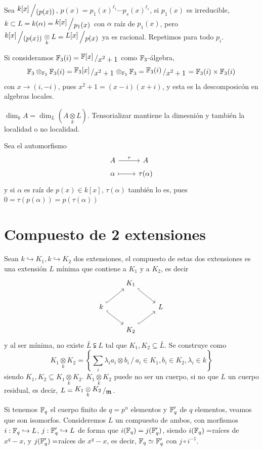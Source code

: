 \begin{ejem}
    Sea $\modulo{k[x]}{(p(x))}$, $p(x) = p_1(x)^{\ell_1} \cdots p_s(x)^{\ell_s}$, si $p_1(x)$ es irreducible, $k \subset L=k(\alpha) = \modulo{k[x]}{p_1(x)}$ con $\alpha$ ra\'iz de $p_1(x)$, pero $\modulo{k[x]}{(p(x))} \underset{k}{\otimes} L = \modulo{L[x]}{p(x)}$ ya es racional. Repetimos para todo $p_i$.
    
    Si consideramos $\bb F_3(i) = \modulo{\bb F[x]}{x^2+1}$ como $\mathbb{F}_3$-\'algebra, 
    $$\bb F_3 \otimes_{\bb F_3} \bb F_3(i) = \modulo{\bb F_3[x]}{x^2+1} \otimes_{\bb F_3} \bb F_3 = \modulo{\bb F_3(i)}{x^2+1} = \bb F_3(i) \times \bb F_3(i)$$
    con $x\to (i,-i)$, pues $x^2+1=(x-i)(x+i)$, y esta es la descomposic\'on en algebras locales.
\end{ejem}
\begin{prop}
    $\dim_k A = \dim_L(A \underset{k}{\otimes} L)$. Tensorializar mantiene la dimesni\'on y tambi\'en la localidad o no localidad. 
\end{prop}
\begin{obs}
    Sea el automorfismo
    $$\bt A \rar{\tau} & A \\[-5mm] \alpha \rarmaps & \tau(\alpha) \et$$
    y si $\alpha$ es ra\'iz de $p(x)\in k[x]$, $\tau(\alpha)$ tambi\'en lo es, pues $0 = \tau(p(\alpha)) = p(\tau(\alpha))$
\end{obs}
\section{Compuesto de 2 extensiones}
Sean $k \hookrightarrow K_1, k\hookrightarrow K_2$ dos extensiones, el compuesto de estas dos extensiones es una extensi\'on $L$ m\'inima que contiene a $K_1$ y a $K_2$, es decir
$$\bt & K_1  \arrow[hook]{rd}\\ k \arrow[hook]{ru} \arrow[hook]{rd} &  & L\\ & \arrow[hook]{ru}  K_2 \et$$
y al ser m\'inima, no existe $\bar L \subsetneqq L $ tal que $K_1,K_2 \subseteq \bar L$. Se construye como
$$K_1 \underset{k}{\otimes} K_2 = \left\{ \sum_i \lambda_i a_i \otimes b_i \, / \, a_i \in K_1, b_i \in K_2, \lambda_i \in k \right\}$$ 
siendo $K_1,K_2 \subseteq K_1\underset{k}{\otimes} K_2$. $K_1\underset{k}{\otimes} K_2$ puede no ser un cuerpo, si no que $L$ un cuerpo residual, es decir, $L = \modulo{K_1\underset{k}{\otimes} K_2}{\m}$.

Si tenemos $\mathbb{F}_q$ el cuerpo finito de $q=p^n$ elementos y $\mathbb{F}'_q$ de $q$ elementos, veamos que son isomorfos. Consideremos $L$ un compuesto de ambos, con morfismos $i: \mathbb{F}_q \hookrightarrow L$, $j: \mathbb{F}'_q \hookrightarrow L$ de forma que $i(\mathbb{F}_q) = j(\mathbb{F}'_q)$, siendo $i(\mathbb{F}_q) =$ra\'ices de $x^q-x$, y $j(\mathbb{F}'_q)=$ra\'ices de $x^q-x$, es decir, $\mathbb{F}_q \simeq \mathbb{F}'_q$ con $j \circ i^{-1}$. 

